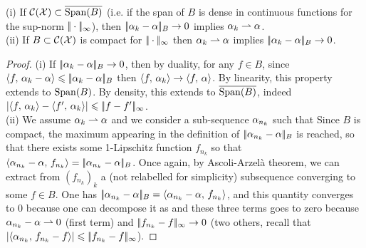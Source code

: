 \begin{prop}\label{prop-metrization}
	(i) If $\mathcal{C}(\mathcal{X}) \subset \overline{\operatorname{Span}(B)}$ (i.e. if the span of $B$ is dense in continuous functions for the sup-norm $|\!| \cdot |\!|_\infty$), then $|\!| \alpha_k-\alpha |\!|_B \rightarrow 0$ implies $\alpha_k \rightharpoonup \alpha$.  \\
	(ii) If $B \subset \mathcal{C}(\mathcal{X})$ is compact for  $|\!| \cdot |\!|_\infty$ then $\alpha_k \rightharpoonup \alpha$ implies $|\!| \alpha_k-\alpha |\!|_B \rightarrow 0$.
\end{prop}
\begin{proof} 
(i) If  $|\!| \alpha_k-\alpha |\!|_B \rightarrow 0$, then by duality, for any $f \in B$, 
 since $\langle f,\,\alpha_k - \alpha\rangle \leqslant |\!| \alpha_k-\alpha |\!|_B$ then $\langle f,\,\alpha_k\rangle \rightarrow \langle f,\,\alpha\rangle$. By linearity, this property extends to $\operatorname{Span}(B)$. 
%
By density, this extends to $\overline{\operatorname{Span}(B)}$, indeed $|\langle f,\,\alpha_k\rangle - \langle f',\,\alpha_k\rangle| \leqslant |\!| f-f' |\!|_\infty$. \\
(ii) We assume $\alpha_k \rightharpoonup \alpha$ and we consider a sub-sequence $\alpha_{n_k}$ such that 
Since $B$ is compact, the maximum appearing in the definition of $|\!| \alpha_{n_k}-\alpha |\!|_B$ is reached, so that there exists some 1-Lipschitz function $f_{n_k}$ so that $\langle \alpha_{n_k}-\alpha,\,f_{n_k}\rangle = |\!| \alpha_{n_k}-\alpha |\!|_B$. Once again, by Ascoli-Arzel\`a theorem, we can extract from $(f_{n_k})_k$ a (not relabelled for simplicity) subsequence converging to some $f \in B$. One has $|\!| \alpha_{n_k}-\alpha |\!|_{B} = \langle \alpha_{n_k}-\alpha,\,f_{n_k}\rangle$, and this quantity converges to 0 because one can decompose it as
and these three terms goes to zero because $\alpha_{n_k}-\alpha \rightharpoonup 0$ (first term)
and $|\!| f_{n_k} - f |\!|_\infty \rightarrow 0$ (two others, recall that $|\langle \alpha_{n_k},\,f_{n_k} - f\rangle| \leqslant |\!| f_{n_k} - f |\!|_\infty$).
\end{proof}


